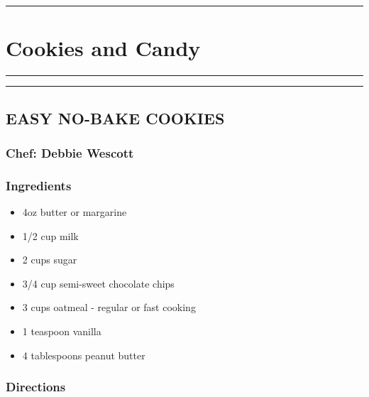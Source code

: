 \documentclass[
]{book}
\providecommand{\tightlist}{%
  \setlength{\itemsep}{0pt}\setlength{\parskip}{0pt}}
\begin{document}
\begin{center}\rule{0.5\linewidth}{0.5pt}\end{center}

\hypertarget{Cookies}{%
\chapter{Cookies and Candy}\label{Cookies}}

\begin{center}\rule{0.5\linewidth}{0.5pt}\end{center}

\begin{center}\rule{0.5\linewidth}{0.5pt}\end{center}

\hypertarget{easy-no-bake-cookies}{%
\section*{EASY NO-BAKE COOKIES}\label{easy-no-bake-cookies}}


\hypertarget{chef-debbie-wescott-5}{%
\subsection*{Chef: Debbie Wescott}\label{chef-debbie-wescott-5}}


\hypertarget{ingredients-92}{%
\subsection*{Ingredients}\label{ingredients-92}}


\begin{itemize}
\tightlist
\item
  4oz butter or margarine
\item
  1/2 cup milk
\item
  2 cups sugar
\item
  3/4 cup semi-sweet chocolate chips
\item
  3 cups oatmeal - regular or fast cooking
\item
  1 teaspoon vanilla
\item
  4 tablespoons peanut butter
\end{itemize}

\hypertarget{directions-92}{%
\subsection*{Directions}\label{directions-92}}
\end{document}
